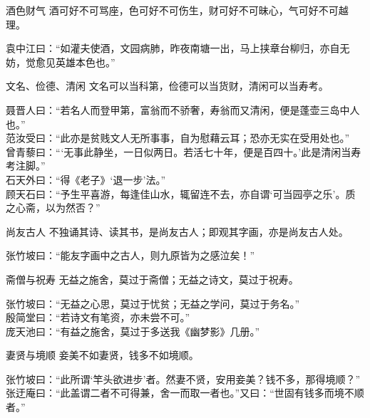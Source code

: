 \begin{yulu}{酒色财气}
酒可好不可骂座，色可好不可伤生，财可好不可昧心，气可好不可越理。
\begin{comments}
袁中江曰：“如灌夫使酒，文园病肺，昨夜南塘一出，马上挟章台柳归，亦自无妨，觉愈见英雄本色也。”
\end{comments}
\end{yulu}

\begin{yulu}{文名、俭德、清闲}
文名可以当科第，俭德可以当货财，清闲可以当寿考。
\begin{comments}
聂晋人曰：“若名人而登甲第，富翁而不骄奢，寿翁而又清闲，便是蓬壶三岛中人也。” \\
范汝受曰：“此亦是贫贱文人无所事事，自为慰藉云耳；恐亦无实在受用处也。” \\
曾青藜曰：“‘无事此静坐，一日似两日。若活七十年，便是百四十。’此是清闲当寿考注脚。” \\
石天外曰：“得《老子》‘退一步’法。” \\
顾天石曰：“予生平喜游，每逢佳山水，辄留连不去，亦自谓‘可当园亭之乐’。质之心斋，以为然否？”
\end{comments}
\end{yulu}

\begin{yulu}{尚友古人}
不独诵其诗、读其书，是尚友古人；即观其字画，亦是尚友古人处。
\begin{comments}
张竹坡曰：“能友字画中之古人，则九原皆为之感泣矣！”
\end{comments}
\end{yulu}

\begin{yulu}{斋僧与祝寿}
无益之施舍，莫过于斋僧；无益之诗文，莫过于祝寿。
\begin{comments}
张竹坡曰：“无益之心思，莫过于忧贫；无益之学问，莫过于务名。” \\
殷简堂曰：“若诗文有笔资，亦未尝不可。” \\
庞天池曰：“有益之施舍，莫过于多送我《幽梦影》几册。”
\end{comments}
\end{yulu}

\begin{yulu}{妻贤与境顺}
妾美不如妻贤，钱多不如境顺。
\begin{comments}
张竹坡曰：“此所谓‘竿头欲进步’者。然妻不贤，安用妾美？钱不多，那得境顺？” \\
张迂庵曰：“此盖谓二者不可得兼，舍一而取一者也。”又曰：“世固有钱多而境不顺者。”
\end{comments}
\end{yulu}

